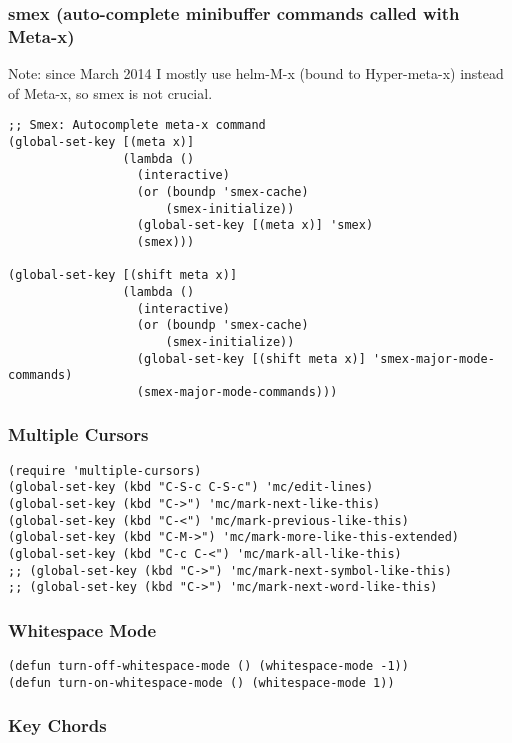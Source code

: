 \documentclass[nofonts]{tufte-handout}
\begin{document}
\subsubsection{smex (auto-complete minibuffer commands called with Meta-x)}
\label{sec-1-11-13}

Note: since March 2014 I mostly use helm-M-x (bound to Hyper-meta-x) instead of Meta-x, so smex is not crucial.

\begin{verbatim}
;; Smex: Autocomplete meta-x command
(global-set-key [(meta x)]
                (lambda ()
                  (interactive)
                  (or (boundp 'smex-cache)
                      (smex-initialize))
                  (global-set-key [(meta x)] 'smex)
                  (smex)))

(global-set-key [(shift meta x)]
                (lambda ()
                  (interactive)
                  (or (boundp 'smex-cache)
                      (smex-initialize))
                  (global-set-key [(shift meta x)] 'smex-major-mode-commands)
                  (smex-major-mode-commands)))
\end{verbatim}

\subsubsection{Multiple Cursors}
\label{sec-1-11-14}

\begin{verbatim}
(require 'multiple-cursors)
(global-set-key (kbd "C-S-c C-S-c") 'mc/edit-lines)
(global-set-key (kbd "C->") 'mc/mark-next-like-this)
(global-set-key (kbd "C-<") 'mc/mark-previous-like-this)
(global-set-key (kbd "C-M->") 'mc/mark-more-like-this-extended)
(global-set-key (kbd "C-c C-<") 'mc/mark-all-like-this)
;; (global-set-key (kbd "C->") 'mc/mark-next-symbol-like-this)
;; (global-set-key (kbd "C->") 'mc/mark-next-word-like-this)
\end{verbatim}

\subsubsection{Whitespace Mode}
\label{sec-1-11-15}

\begin{verbatim}
(defun turn-off-whitespace-mode () (whitespace-mode -1))
(defun turn-on-whitespace-mode () (whitespace-mode 1))
\end{verbatim}

\subsubsection{Key Chords}
\label{sec-1-11-16}
\end{document}
